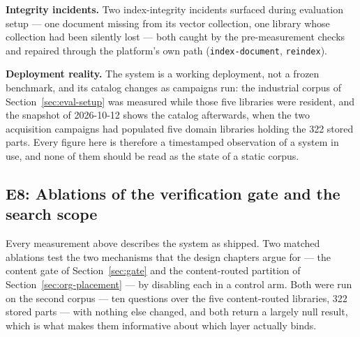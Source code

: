 \textbf{Integrity incidents.}
Two index-integrity incidents surfaced during evaluation setup --- one
document missing from its vector collection, one library whose collection
had been silently lost --- both caught by the pre-measurement checks and
repaired through the platform's own path (\texttt{index-document},
\texttt{reindex}).

\textbf{Deployment reality.}
The system is a working deployment, not a frozen benchmark, and its catalog
changes as campaigns run: the industrial corpus of
Section~\ref{sec:eval-setup} was measured while those five libraries were
resident, and the snapshot of 2026-10-12 shows the catalog afterwards, when
the two acquisition campaigns had populated five domain libraries holding
the 322 stored parts. Every figure here is therefore a timestamped
observation of a system in use, and none of them should be read as the
state of a static corpus.

\subsection{E8: Ablations of the verification gate and the search scope}
\label{sec:e8}
Every measurement above describes the system as shipped. Two matched
ablations test the two mechanisms that the design chapters argue for --- the
content gate of Section~\ref{sec:gate} and the content-routed partition of
Section~\ref{sec:org-placement} --- by disabling each in a control arm. Both
were run on the second
corpus --- ten questions over the five content-routed libraries, 322
stored parts --- with nothing else changed, and both return a largely null
result, which is what makes them informative about which layer actually
binds.

